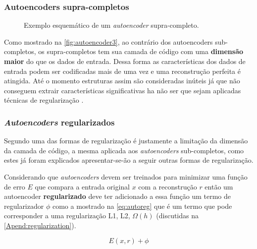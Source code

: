 			\subsubsection{Autoencoders supra-completos}
			
				\begin{figure}[H]
					\centering
					\caption[Exemplo esquemático de um autoencoder supra-completo]{Exemplo esquemático de um \textit{autoencoder} supra-completo.}
					
					\label{fig:autoencoder3}
				\end{figure}
			
				\par Como mostrado na  \autoref{fig:autoencoder3}, ao contrário dos autoencoders sub-completos, os supra-completos tem sua camada de código com uma \textbf{dimensão maior} do que os dados de entrada. Dessa forma as características dos dados de entrada podem ser codificadas mais de uma vez e uma reconstrução perfeita é atingida. Até o momento estruturas assim são consideradas inúteis já que não conseguem extrair características significativas ha não ser que sejam aplicadas técnicas de regularização \cite{bengio2014representation}.
				
			\subsubsection{\textit{Autoencoders} regularizados}
				
				\par Segundo \cite{bengio2014representation} uma das formas de regularização é justamente a limitação da dimensão da camada de código, a mesma aplicada aos \textit{autoencoders} sub-completos, como estes já foram explicados apresentar-se-ão a seguir outras formas de regularização.
				
				\par Considerando que \textit{autoencoders} devem ser treinados para minimizar uma função de erro $E$ que compara a entrada original $x$ com a reconstrução $r$ então um autoencoder \textbf{regularizado} deve ter adicionado a essa função um termo de regularizador $\phi$ como a mostrado na \autoref{eq:autoreg} que é um termo que pode corresponder a uma regularização L1, L2, $\Omega(h)$ (discutidas na \autoref{Apend:regularization}).
				
				\begin{equation}
					\label{eq:autoreg}
					E(x, r) + \phi
				\end{equation}
			
